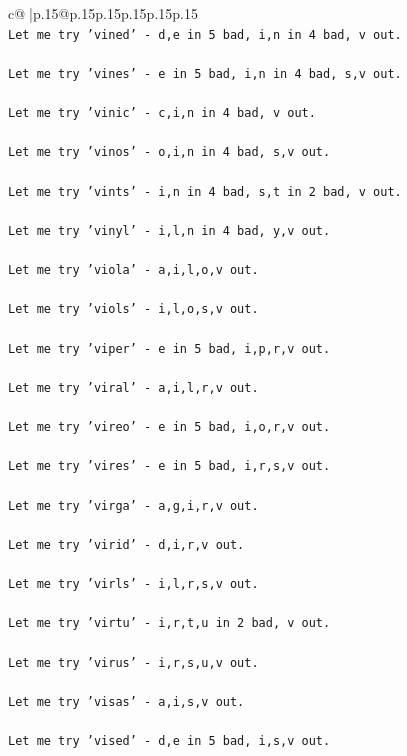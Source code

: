 \documentclass{article}
\begin{document}
{\begin{supertabular}{c@{$\;$}|p{.15\linewidth}@{}p{.15\linewidth}p{.15\linewidth}p{.15\linewidth}p{.15\linewidth}p{.15\linewidth}}
{{{\\ 
\texttt{Let me try 'vined' {-} d,e in 5 bad, i,n in 4 bad, v out. } \\
\\ 
\texttt{Let me try 'vines' {-} e in 5 bad, i,n in 4 bad, s,v out. } \\
\\ 
\texttt{Let me try 'vinic' {-} c,i,n in 4 bad, v out. } \\
\\ 
\texttt{Let me try 'vinos' {-} o,i,n in 4 bad, s,v out. } \\
\\ 
\texttt{Let me try 'vints' {-} i,n in 4 bad, s,t in 2 bad, v out. } \\
\\ 
\texttt{Let me try 'vinyl' {-} i,l,n in 4 bad, y,v out. } \\
\\ 
\texttt{Let me try 'viola' {-} a,i,l,o,v out. } \\
\\ 
\texttt{Let me try 'viols' {-} i,l,o,s,v out. } \\
\\ 
\texttt{Let me try 'viper' {-} e in 5 bad, i,p,r,v out. } \\
\\ 
\texttt{Let me try 'viral' {-} a,i,l,r,v out. } \\
\\ 
\texttt{Let me try 'vireo' {-} e in 5 bad, i,o,r,v out. } \\
\\ 
\texttt{Let me try 'vires' {-} e in 5 bad, i,r,s,v out. } \\
\\ 
\texttt{Let me try 'virga' {-} a,g,i,r,v out. } \\
\\ 
\texttt{Let me try 'virid' {-} d,i,r,v out. } \\
\\ 
\texttt{Let me try 'virls' {-} i,l,r,s,v out. } \\
\\ 
\texttt{Let me try 'virtu' {-} i,r,t,u in 2 bad, v out. } \\
\\ 
\texttt{Let me try 'virus' {-} i,r,s,u,v out. } \\
\\ 
\texttt{Let me try 'visas' {-} a,i,s,v out. } \\
\\ 
\texttt{Let me try 'vised' {-} d,e in 5 bad, i,s,v out. } \\
}}}
\end{supertabular}}
\end{document}
